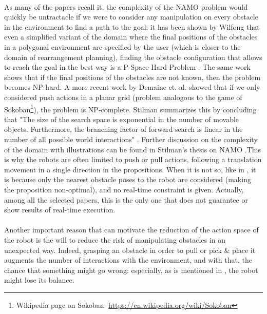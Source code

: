 \paragraph{} As many of the papers \parencite{stilman_navigation_2005, stilman_planning_2007, stilman_planning_2008, wu_navigation_2010, levihn_planning_2013, levihn_locally_2014, scholz_navigation_2016} recall it, the complexity of the NAMO problem would quickly be untractacle if we were to consider any manipulation on every obstacle in the environment to find a path to the goal: it has been shown by Wilfong that even a simplified variant of the domain where the final positions of the obstacles in a polygonal environment are specified by the user (which is closer to the domain of rearrangement planning), finding the obstacle configuration that allows to reach the goal in the best way is a P-Space Hard Problem \parencite{wilfong_motion_1991}. The same work shows that if the final positions of the obstacles are not known, then the problem becomes NP-hard. A more recent work by Demaine et. al. showed that if we only considered push actions in a planar grid (problem analogous to the game of Sokoban\footnote{Wikipedia page on Sokoban: \url{https://en.wikipedia.org/wiki/Sokoban}}), the problem is NP-complete. Stilman summarizes this by concluding that "The size of the search space is exponential in the number of movable objects. Furthermore, the branching factor of forward search is linear in the number of all possible world interactions" \parencite{stilman_planning_2008}. Further discussion on the complexity of the domain with illustrations can be found in Stilman's thesis on NAMO \parencite{stilman_navigation_2007}.This is why the robots are often limited to push or pull actions, following a translation movement in a single direction in the propositions. When it is not so, like in \parencite{okada_environment_2004}, it is because only the nearest obstacle poses to the robot are considered (making the proposition non-optimal), and no real-time constraint is given. Actually, among all the selected papers, this is the only one that does not guarantee or show results of real-time execution.

\paragraph{} Another important reason that can motivate the reduction of the action space of the robot is the will to reduce the risk of manipulating obstacles in an unexpected way. Indeed, grasping an obstacle in order to pull or pick \& place it augments the number of interactions with the environment, and with that, the chance that something might go wrong: especially, as is mentioned in \parencite{stilman_planning_2007}, the robot might lose its balance.

